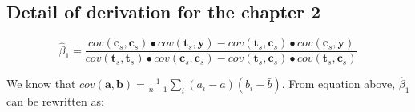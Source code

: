 




\begin{appendices}
\chapter{Detail of derivation for the chapter 2}

\begin{equation}\label{eq1}
\hat{\beta }_{1}=\frac{cov\left( \mathbf{c}_{s},\mathbf{c}_{s} \right)\bullet cov\left( \mathbf{t}_{s},\mathbf{y} \right)-cov\left( \mathbf{t}_{s},\mathbf{c}_{s} \right)\bullet cov\left( \mathbf{c}_{s},\mathbf{y} \right)}{cov\left( \mathbf{t}_{s},\mathbf{t}_{s} \right)\bullet cov\left( \mathbf{c}_{s},\mathbf{c}_{s} \right)-cov\left( \mathbf{t}_{s},\mathbf{c}_{s} \right)\bullet cov\left( \mathbf{t}_{s},\mathbf{c}_{s} \right)}
\end{equation}

We know that $cov\left( \mathbf{a},\mathbf{b}\right)=\frac{1}{n-1}\sum\nolimits_i {\left( a_{i}-\bar{a} \right)\left(
b_{i}-\bar{b} \right)} $. From equation above, $\hat{\beta }_{1}$ can be rewritten as:


\end{appendices}
